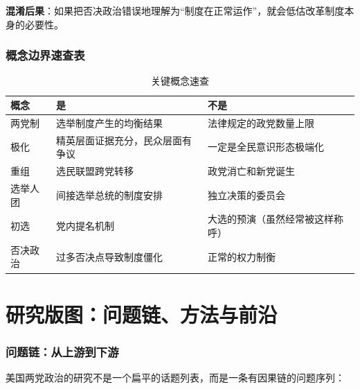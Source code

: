 \documentclass[12pt,a4paper]{ctexart}
\begin{document}
\textbf{混淆后果}：如果把否决政治错误地理解为``制度在正常运作''，就会低估改革制度本身的必要性。

\section{概念边界速查表}

\begin{table}[h]
\centering
\caption{关键概念速查}
\begin{tabular}{@{}lp{5.4cm}p{6.6cm}@{}}
\toprule
\textbf{概念} & \textbf{是} & \textbf{不是} \\
\midrule
两党制 & 选举制度产生的均衡结果 & 法律规定的政党数量上限 \\
极化 & 精英层面证据充分，民众层面有争议 & 一定是全民意识形态极端化 \\
重组 & 选民联盟跨党转移 & 政党消亡和新党诞生 \\
选举人团 & 间接选举总统的制度安排 & 独立决策的委员会 \\
初选 & 党内提名机制 & 大选的预演（虽然经常被这样称呼） \\
否决政治 & 过多否决点导致制度僵化 & 正常的权力制衡 \\
\bottomrule
\end{tabular}
\end{table}

\clearpage

\part{研究版图：问题链、方法与前沿}

\section{问题链：从上游到下游}

美国两党政治的研究不是一个扁平的话题列表，而是一条有因果链的问题序列：
\end{document}
